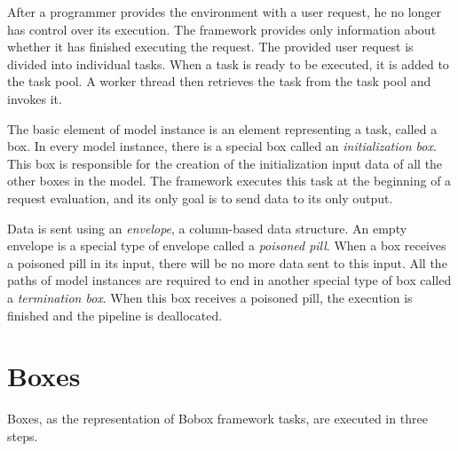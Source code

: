 After a programmer provides the environment with a user request, he no longer has control over its execution. The framework provides only information about whether it has finished executing the request. The provided user request is divided into individual tasks. When a task is ready to be executed, it is added to the task pool. A worker thread then retrieves the task from the task pool and invokes it.

The basic element of model instance is an element representing a task, called a box. In every model instance, there is a special box called an \emph{initialization box}. This box is responsible for the creation of the initialization input data of all the other boxes in the model. The framework executes this task at the beginning of a request evaluation, and its only goal is to send data to its only output.

Data is sent using an \emph{envelope}, a column-based data structure. An empty envelope is a special type of envelope called a \emph{poisoned pill}. When a box receives a poisoned pill in its input, there will be no more data sent to this input. All the paths of model instances are required to end in another special type of box called a \emph{termination box}. When this box receives a poisoned pill, the execution is finished and the pipeline is deallocated.

\section{Boxes}
\label{bobox-boxes}
Boxes, as the representation of Bobox framework tasks, are executed in three steps.

